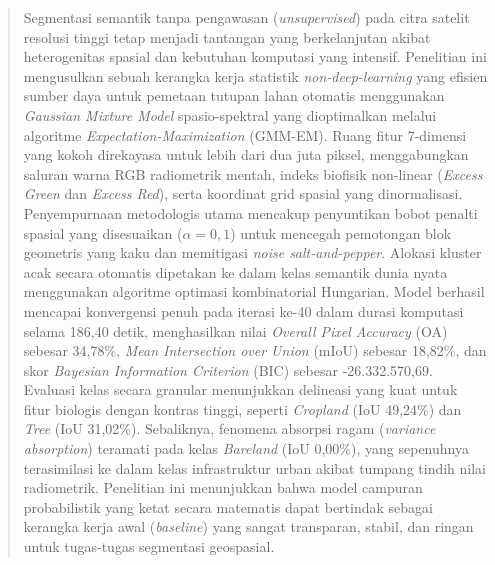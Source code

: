 \documentclass[11pt,twoside]{article}
\author{
\begin{minipage}{\textwidth}
\raggedright %
\setstretch{1.1}
{\large \authorone} \\[0.6em]
{\small
\affilone \\[0.5em]
\corrauthor
}
\end{minipage}
}
\begin{document}
\newcommand{\INCLUDECOVER}{}

\clearpage

\maketitle

\begin{abstract}

Segmentasi semantik tanpa pengawasan (\textit{unsupervised}) pada citra satelit resolusi tinggi tetap menjadi tantangan yang berkelanjutan akibat heterogenitas spasial dan kebutuhan komputasi yang intensif. Penelitian ini mengusulkan sebuah kerangka kerja statistik \textit{non-deep-learning} yang efisien sumber daya untuk pemetaan tutupan lahan otomatis menggunakan \textit{Gaussian Mixture Model} spasio-spektral yang dioptimalkan melalui algoritme \textit{Expectation-Maximization} (GMM-EM). Ruang fitur 7-dimensi yang kokoh direkayasa untuk lebih dari dua juta piksel, menggabungkan saluran warna RGB radiometrik mentah, indeks biofisik non-linear (\textit{Excess Green} dan \textit{Excess Red}), serta koordinat grid spasial yang dinormalisasi. Penyempurnaan metodologis utama mencakup penyuntikan bobot penalti spasial yang disesuaikan ($\alpha = 0,1$) untuk mencegah pemotongan blok geometris yang kaku dan memitigasi \textit{noise salt-and-pepper}. Alokasi kluster acak secara otomatis dipetakan ke dalam kelas semantik dunia nyata menggunakan algoritme optimasi kombinatorial Hungarian. Model berhasil mencapai konvergensi penuh pada iterasi ke-40 dalam durasi komputasi selama 186,40 detik, menghasilkan nilai \textit{Overall Pixel Accuracy} (OA) sebesar 34,78\%, \textit{Mean Intersection over Union} (mIoU) sebesar 18,82\%, dan skor \textit{Bayesian Information Criterion} (BIC) sebesar -26.332.570,69. Evaluasi kelas secara granular menunjukkan delineasi yang kuat untuk fitur biologis dengan kontras tinggi, seperti \textit{Cropland} (IoU 49,24\%) dan \textit{Tree} (IoU 31,02\%). Sebaliknya, fenomena absorpsi ragam (\textit{variance absorption}) teramati pada kelas \textit{Bareland} (IoU 0,00\%), yang sepenuhnya terasimilasi ke dalam kelas infrastruktur urban akibat tumpang tindih nilai radiometrik. Penelitian ini menunjukkan bahwa model campuran probabilistik yang ketat secara matematis dapat bertindak sebagai kerangka kerja awal (\textit{baseline}) yang sangat transparan, stabil, dan ringan untuk tugas-tugas segmentasi geospasial.

\end{abstract}
\end{document}

